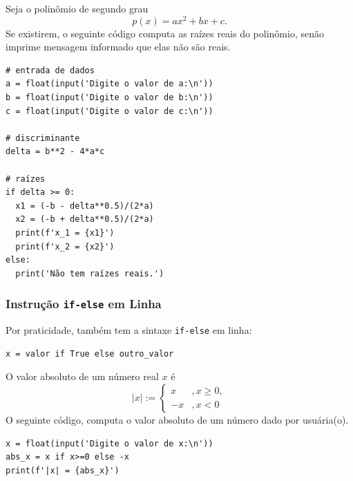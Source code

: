 \begin{ex}
  Seja o polinômio de segundo grau
  \begin{equation}
    p(x) = ax^2 + bx + c.
  \end{equation}
  Se existirem, o seguinte código computa as raízes reais do polinômio, senão imprime mensagem informado que elas não são reais.

\begin{lstlisting}
# entrada de dados
a = float(input('Digite o valor de a:\n'))
b = float(input('Digite o valor de b:\n'))
c = float(input('Digite o valor de c:\n'))

# discriminante
delta = b**2 - 4*a*c

# raízes
if delta >= 0:
  x1 = (-b - delta**0.5)/(2*a)
  x2 = (-b + delta**0.5)/(2*a)
  print(f'x_1 = {x1}')
  print(f'x_2 = {x2}')
else:
  print('Não tem raízes reais.')
\end{lstlisting}

\end{ex}

\subsubsection{Instrução \lstinline+if-else+ em Linha}

Por praticidade, {\python} também tem a sintaxe \lstinline+if-else+ em linha:

\begin{lstlisting}
x = valor if True else outro_valor
\end{lstlisting}

\begin{ex}
  O valor absoluto de um número real $x$ é
  \begin{equation}
    |x| := \left\{
      \begin{array}{ll}
        x &, x\geq 0,\\
        -x &, x<0
      \end{array}
    \right.
  \end{equation}
  O seguinte código, computa o valor absoluto de um número dado por usuária(o).
  
\begin{lstlisting}
x = float(input('Digite o valor de x:\n'))
abs_x = x if x>=0 else -x
print(f'|x| = {abs_x}')
\end{lstlisting}

\end{ex}

